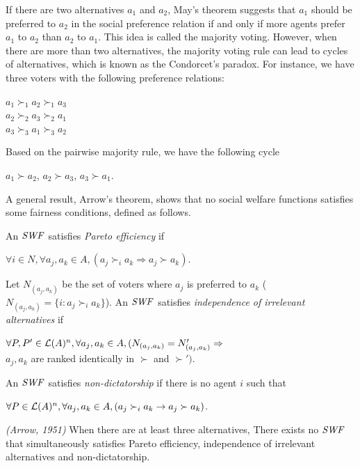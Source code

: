 If there are two alternatives $a_1$ and $a_2$,
May's theorem \cite{May52} suggests that $a_1$ should be
preferred to $a_2$ in the social preference relation
if and only if more agents prefer $a_1$ to $a_2$ than
$a_2$ to $a_1$.
This idea is called the majority voting.
However, when there are more than two alternatives,
the majority voting rule can lead to cycles of
alternatives, which is known as the Condorcet's paradox.
For instance, we have three voters with the following
preference relations:
\begin{center}
	$a_1 \succ_1 a_2 \succ_1 a_3$\\
	$a_2 \succ_2 a_3 \succ_2 a_1$\\
	$a_3 \succ_3 a_1 \succ_3 a_2$
\end{center}
Based on the pairwise majority rule, we have the following cycle
\begin{center}
	$a_1 \succ a_2$, $a_2 \succ a_3$, $a_3 \succ a_1$. 
\end{center}

A general result, Arrow's theorem, shows that no social welfare
functions satisfies some fairness conditions, defined as follows.

\begin{definition}
	An $\it{SWF}$ satisfies \textit{Pareto efficiency} if 
	\begin{center}
		$\forall i \in N, \forall a_j,a_k \in A, (a_j \succ_i a_k \Rightarrow a_j \succ a_k)$.
	\end{center}
	Let $N_{(a_j,a_k)}$ be the set of voters where
	$a_j$ is preferred to $a_k$ ($N_{(a_j,a_k)}=\{i:a_j \succ_i a_k\}$).
	An $\it{SWF}$ satisfies \textit{independence of irrelevant alternatives} if
	\begin{center}
		$\forall P,P' \in \mathcal{L}(A)^n, \forall a_j,a_k \in A, (N_{(a_j,a_k)}=N'_{(a_j,a_k)}\Rightarrow$\\
		$a_j,a_k$ are ranked identically in $\succ$ and $\succ')$.
	\end{center}
	An $\it{SWF}$ satisfies \textit{non-dictatorship} if there is no agent $i$ such that
	\begin{center}
		$\forall P \in \mathcal{L}(A)^n, \forall a_j,a_k \in A, (a_j \succ_i a_k \rightarrow a_j \succ a_k)$.
	\end{center}
\end{definition}

\begin{thm}
\label{thm:Arrow}
\emph{(Arrow, 1951)}
	When there are at least three alternatives,
	There exists no $\it{SWF}$ that simultaneously satisfies
	Pareto efficiency, independence of irrelevant alternatives
	and non-dictatorship.
\end{thm}



